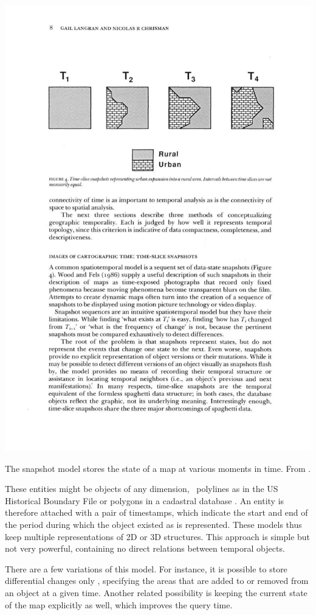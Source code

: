{\includegraphics[width=0.6\marginparwidth]{figs/st_snapshot3}
\caption[The snapshot model]{The snapshot model stores the state of a map at various moments in time. From \citet{Langran88}.}
\label{fig:st_snapshot}
}
These entities might be objects of any dimension, \eg\ polylines as in the US Historical Boundary File or polygons in a cadastral database \citep{Hunter90}.
An entity is therefore attached with a pair of timestamps, which indicate the start and end of the period during which the object existed as is represented.
These models thus keep multiple representations of 2D \citep{Armstrong88} or 3D \citep{Hamre97} structures.
This approach is simple but not very powerful, containing no direct relations between temporal objects.

There are a few variations of this model.
For instance, it is possible to store differential changes only \citep{Langran88}, specifying the areas that are added to or removed from an object at a given time.
Another related possibility is keeping the current state of the map explicitly as well, which improves the query time.

